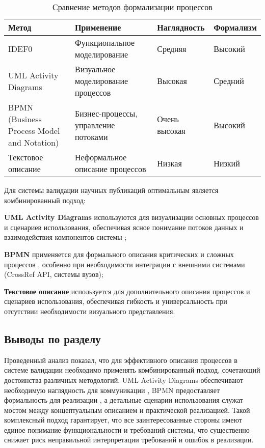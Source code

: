 \begin{table}[h]
	\caption{Сравнение методов формализации процессов}
	\label{tab:process-formalization-methods}
	\centering
	\begin{tabular}{|p{}|p{}|p{}|p{}|}
		\hline
		Метод & Применение & Наглядность & Формализм \\
		\hline
		IDEF0 & Функциональное моделирование & Средняя & Высокий \\
		\hline
		UML Activity Diagrams & Визуальное моделирование процессов & Высокая & Средний \\
		\hline
		BPMN (Business Process Model and Notation) & Бизнес-процессы, управление потоками & Очень высокая & Высокий \\
		\hline
		Текстовое описание & Неформальное описание процессов & Низкая & Низкий \\
		\hline
	\end{tabular}
\end{table}

Для системы валидации научных публикаций оптимальным является комбинированный подход:

\begin{compactenum}
	\item \textbf{UML Activity Diagrams} используются для визуализации основных процессов 
	и сценариев использования, обеспечивая ясное понимание потоков данных и взаимодействия
	компонентов системы \cite{uml,business-laguna, cognitive-systems-research};
	\item \textbf{BPMN} применяется для формального описания критических и сложных процессов \cite{business-laguna,cognitive-systems-research,info-tech},
	особенно при необходимости интеграции с внешними системами (CrossRef API, системы вузов);
	\item \textbf{Текстовое описание} используется для дополнительного описания процессов и сценариев использования,
	обеспечивая гибкость и универсальность при отсутствии необходимости визуального представления.
\end{compactenum}

\subsection{Выводы по разделу}
Проведенный анализ показал, что для эффективного описания процессов в системе валидации 
необходимо применять комбинированный подход, сочетающий достоинства различных методологий.
UML Activity Diagrams обеспечивают необходимую наглядность для коммуникации \cite{uml}, 
BPMN предоставляет формальность для реализации \cite{business-laguna,info-tech}, а детальные сценарии
использования служат мостом между концептуальным описанием и практической реализацией. 
Такой комплексный подход гарантирует, что все заинтересованные стороны имеют
единое понимание функциональности и требований системы, что существенно снижает риск
неправильной интерпретации требований и ошибок в реализации.


